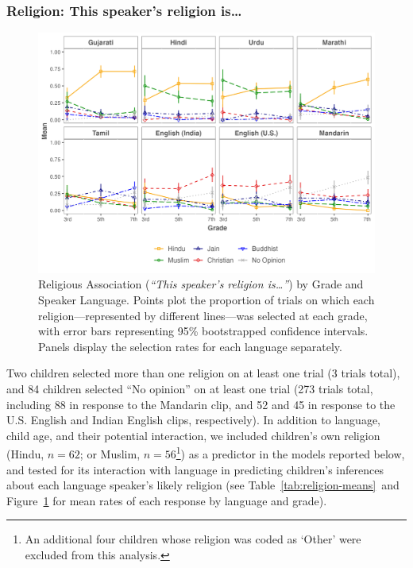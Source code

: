 \documentclass{foushee-adapted-preprint}
\newcommand{\religionmeanstab}{\ref{tab:religion-means}}
\begin{document}
\subsubsection*{Religion: This speaker's religion is\ldots} 
\begin{figure}
    \centering
    \includegraphics[width=1.2\linewidth]{figures/std_plots/religion_std.png}
    \caption{Religious Association (\emph{``This speaker's religion is\ldots''}) by Grade and Speaker Language. Points plot the proportion of trials on which each religion---represented by different lines---was selected at each grade, with error bars representing 95\% bootstrapped confidence intervals. Panels display the selection rates for each language separately.}
    \label{fig:religion}
\vspace{-7pt}
\end{figure}
Two children selected more than one religion on at least one trial (3 trials total), and 84 children selected ``No opinion'' on at least one trial (273 trials total, including 88 in response to the Mandarin clip, and 52 and 45 in response to the U.S. English and Indian English clips, respectively). In addition to language, child age, and their potential interaction, we included children's own religion ({Hindu}, $n=62$; or {Muslim}, $n=56$\footnote{An additional four children whose religion was coded as `Other' were excluded from this analysis.}) as a predictor in the models reported below, and tested for its interaction with language in predicting children's inferences about each language speaker's likely religion (see Table~\religionmeanstab\ and Figure~\ref{fig:religion} for mean rates of each response by language and grade).  
\end{document}
